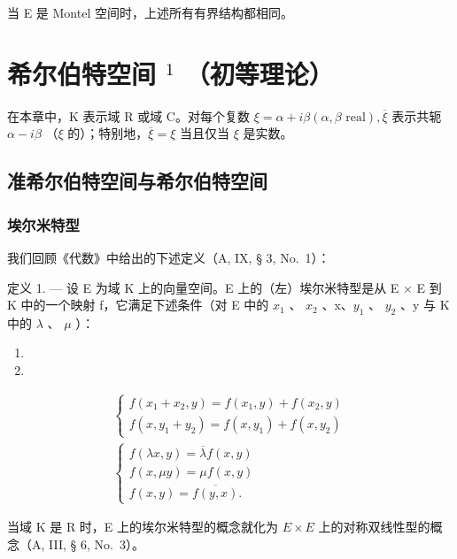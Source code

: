 当 E 是 Montel 空间时，上述所有有界结构都相同。

\chapter{\texorpdfstring{希尔伯特空间 \(^{1}\) （初等理论）}{希尔伯特空间 \^{}\{1\} （初等理论）}}

在本章中，K 表示域 R 或域 C。对每个复数 \(\xi = \alpha + i\beta (\alpha, \beta \text{ real}), \overline{\xi}\) 表示共轭 \(\alpha - i\beta\) （\(\xi\) 的）；特别地，\(\overline{\xi} = \xi\) 当且仅当 \(\xi\) 是实数。

\section{准希尔伯特空间与希尔伯特空间}

\subsection{埃尔米特型}

我们回顾《代数》中给出的下述定义（A, IX, § 3, No.~1）：

定义 1. --- 设 E 为域 K 上的向量空间。E 上的（左）埃尔米特型是从 E × E 到 K 中的一个映射 f，它满足下述条件（对 E 中的 \(x_{1}\) 、 \(x_{2}\) 、x、\(y_{1}\) 、 \(y_{2}\) 、y 与 K 中的 \(\lambda\) 、 \(\mu\) ）：

\begin{enumerate}
\def\labelenumi{(\arabic{enumi})}
\tightlist
\item
\item
\end{enumerate}

\[
\begin{array}{c} \left\{ \begin{array}{l} f (x _ {1} + x _ {2}, y) = f (x _ {1}, y) + f (x _ {2}, y) \\ f (x, y _ {1} + y _ {2}) = f (x, y _ {1}) + f (x, y _ {2}) \end{array} \right. \\ \left\{ \begin{array}{l} f (\lambda x, y) = \overline {{\lambda}} f (x, y) \\ f (x, \mu y) = \mu f (x, y) \\ f (x, y) = \overline {{f (y , x)}}  . \end{array} \right. \end{array}\tag{3}
\]

当域 K 是 R 时，E 上的埃尔米特型的概念就化为 \(E \times E\) 上的对称双线性型的概念（A, III, § 6, No.~3）。

